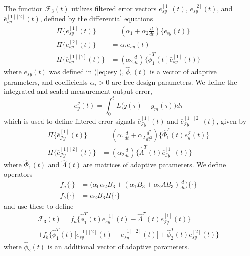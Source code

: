 The function $\mathcal{F}_3(t)$ utilizes filtered error vectors $\overline{e}_{sy}^{[1]}(t)$, $\overline{e}_{sy}^{[2]}(t)$, and $\overline{e}_{sy}^{[1][2]}(t)$, defined by the differential equations
\begin{equation}
\begin{aligned} 
	\Pi \big \{ \overline{e}_{sy}^{[1]}(t) \big \} & = (\alpha_1 + \alpha_2 \frac{d}{dt}) \big \{ e_{sy}(t) \big \} \\
	\Pi \big \{ \overline{e}_{sy}^{[2]}(t) \big \} & = \alpha_2 e_{sy}(t) \\
	\Pi \big \{ \overline{e}_{sy}^{[1][2]}(t) \big \} & = (\alpha_2 \frac{d}{dt}) \big \{ \hat{\phi}_1^T(t) \bar{e}_{sy}^{[1]}(t) \big \}
\end{aligned} \label{eq:esy_rd3}
\end{equation}
where $e_{sy}(t)$ was defined in (\ref{eq:esy}), $\hat{\phi}_1(t)$ is a vector of adaptive parameters, and coefficients $\alpha_i > 0$ are free design parameters. We define the integrated and scaled measurement output error, 
\begin{equation}
e_{y}^{\mathcal{I}}(t) = \int_0^{t} L\big (y(\tau) - y_m(\tau)\big) d\tau
\end{equation}
which is used to define filtered error signals $\overline{e}_{\mathcal{I}y}^{[1]} (t)$ and $\overline{e}_{\mathcal{I}y}^{[1][2]} (t)$, given by
\begin{equation}
\begin{aligned}
	\Pi \big \{  \overline{e}_{\mathcal{I}y}^{[1]} (t) \big \} &= (\alpha_1 \frac{d}{dt} + \alpha_2 \frac{d^2}{dt^2}) \big \{ \hat{\Phi}_1^T (t) e_{y}^{\mathcal{I}}(t) \big \} \\
	\Pi \big \{  \overline{e}_{\mathcal{I}y}^{[1][2]} (t) \big \} &= (\alpha_2 \frac{d}{dt}) \big \{ \hat{\Lambda}^T(t) \overline{e}_{\mathcal{I}y}^{[1]} (t) \big \}
\end{aligned} \label{eq:eIy_rd3}
\end{equation}
where $\hat{\Phi}_1(t)$ and $\hat{\Lambda}(t)$ are matrices of adaptive parameters. We define operators
\begin{equation}
\begin{aligned}
	f_a \{ \cdot \} &= \big(\alpha_0 \alpha_2 B_3 + (\alpha_1 B_3 + \alpha_2 A B_3)\frac{d}{dt} \big) \{ \cdot \} \\
	f_b \{ \cdot \} &= \alpha_2 B_3 \Pi \{ \cdot \}
\end{aligned}
\end{equation}
and use these to define
\begin{multline}
	\mathcal{F}_3(t) = f_a \big \{ \hat{\phi}_1^T(t) \overline{e}_{sy}^{[1]}(t) - \hat{\Lambda}^T(t) \overline{e}_{\mathcal{I}y}^{[1]} (t) \big \} \\
	+ f_b \big \{ \hat{\phi}_1^T(t) \big[\overline{e}_{sy}^{[1][2]}(t) -  \overline{e}_{\mathcal{I}y}^{[1][2]} (t) \big ] + \hat{\phi}_2^T (t) \overline{e}_{sy}^{[2]}(t) \big \} \label{eq:F3}
\end{multline}
where $\hat{\phi}_2(t)$ is an additional vector of adaptive parameters. 

